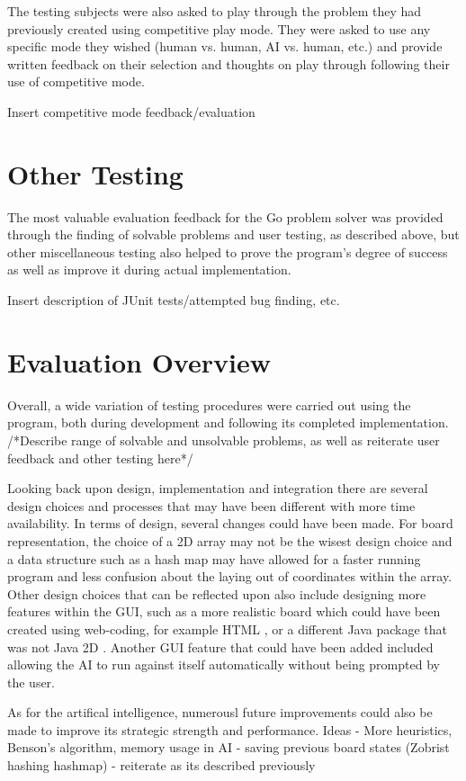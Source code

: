 \documentclass{l3proj}
\begin{document}
The testing subjects were also asked to play through the problem they had previously created using competitive play mode. They were asked to use any specific mode they wished (human vs. human, AI vs. human, etc.) and provide written feedback on their selection and thoughts on play through following their use of competitive mode.

Insert competitive mode feedback/evaluation

\section{Other Testing}

The most valuable evaluation feedback for the Go problem solver was provided through the finding of solvable problems and user testing, as described above, but other miscellaneous testing also helped to prove the program's degree of success as well as improve it during actual implementation.

Insert description of JUnit tests/attempted bug finding, etc.

\section{Evaluation Overview}

Overall, a wide variation of testing procedures were carried out using the program, both during development and following its completed implementation. /*Describe range of solvable and unsolvable problems, as well as reiterate user feedback and other testing here*/

Looking back upon design, implementation and integration there are several design choices and processes that may have been different with more time availability. In terms of design, several changes could have been made. For board representation, the choice of a 2D array may not be the wisest design choice and a data structure such as a hash map may have allowed for a faster running program and less confusion about the laying out of coordinates within the array. Other design choices that can be reflected upon also include designing more features within the GUI, such as a more realistic board which could have been created using web-coding, for example HTML \cite{HTMLRef}, or a different Java package that was not Java 2D \cite{2DAPI}. Another GUI feature that could have been added included allowing the AI to run against itself automatically without being prompted by the user. 

As for the artifical intelligence, numerousl future improvements could also be made to improve its strategic strength and performance.
Ideas - More heuristics, Benson's algorithm, memory usage in AI - saving previous board states (Zobrist hashing hashmap) - reiterate as its described previously
\end{document}
